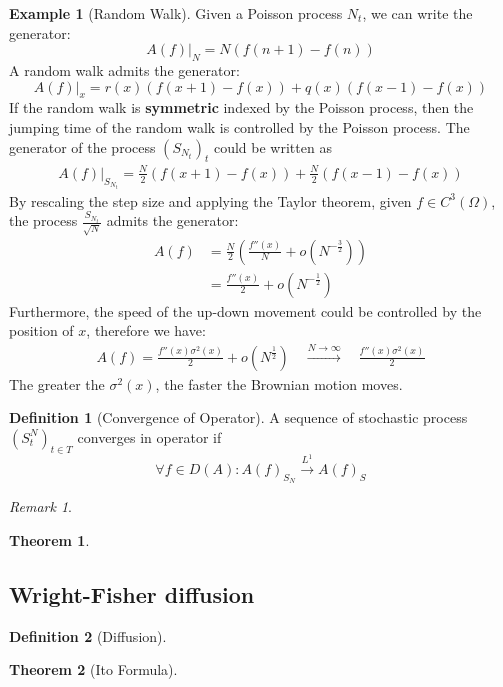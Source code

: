 \documentclass[a4paper,11pt]{book}
\newtheorem{theorem}{Theorem}[section]
\theoremstyle{definition}
\newtheorem{definition}{Definition}[section]
\newtheorem*{example}{Example}
\theoremstyle{remark}
\newtheorem*{remark}{Remark}
\begin{document}
\begin{example}[Random Walk]
Given a Poisson process $N_t$, we can write the generator:
\begin{equation*}
	A(f)|_N = N (f(n+1) - f(n)) 
\end{equation*}
A random walk admits the generator:
\begin{equation*}
	A(f)|_x = r(x)(f(x+1) - f(x)) + q(x)(f(x-1) - f(x))
\end{equation*}
If the random walk is \textbf{symmetric} indexed by the Poisson process, then the jumping time of the random walk is controlled by the Poisson process. The generator of the process $(S_{N_t})_t$ could be written as
\begin{align*}
	A(f)|_{S_{N_t}} = \frac{N}{2} (f(x+1) - f(x)) + \frac{N}{2} (f(x-1) - f(x))
\end{align*} 
By rescaling the step size and applying the Taylor theorem, given $f \in C^3(\Omega)$, the process $\frac{S_{N_t}}{\sqrt{N}}$ admits the generator:
\begin{align*}
	A(f) &= \frac{N}{2}(\frac{f''(x)}{N} + o(N^{-\frac{3}{2}}))\\
	&= \frac{f''(x)}{2} + o(N^{-\frac{1}{2}})
\end{align*}
Furthermore, the speed of the up-down movement could be controlled by the position of $x$, therefore we have:
\begin{align*}
	A(f) = \frac{f''(x) \sigma^2(x)}{2} + o(N^{\frac{1}{2}}) \quad
	 \overset{N \rightarrow \infty}{\longrightarrow} \quad
	 \frac{f''(x) \sigma^2(x)}{2}
\end{align*} 
The greater the $\sigma^2(x)$, the faster the Brownian motion moves.
\end{example}

\begin{definition}[Convergence of Operator]
	A sequence of stochastic process $(S_t^N)_{t \in T}$ converges in operator if 
	\begin{equation*}
		\forall f \in D(A): A(f)_{S_N} \overset{L^1}{\rightarrow} A(f)_S
	\end{equation*}
\end{definition}
\begin{remark}
	
\end{remark}


\begin{theorem}
\end{theorem}


\subsection{Wright-Fisher diffusion}
\begin{definition}[Diffusion]
\end{definition}

\begin{theorem}[Ito Formula]
\end{theorem}
\end{document}
